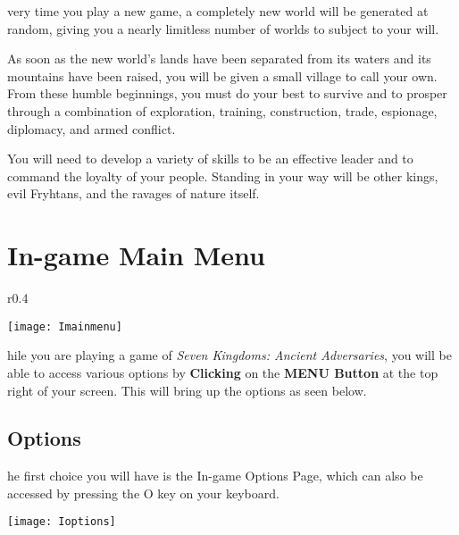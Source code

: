very time you play a new game, a completely new world will be generated at random, giving you a nearly limitless number of worlds to subject to your will.

As soon as the new world’s lands have been separated from its waters and its mountains have been raised, you will be given a small village to call your own. From these humble beginnings, you must do your best to survive and to prosper through a combination of exploration, training, construction, trade, espionage, diplomacy, and armed conflict.

You will need to develop a variety of skills to be an effective leader and to command the loyalty of your people. Standing in your way will be other kings, evil Fryhtans, and the ravages of nature itself.


\section{In-game Main Menu}


\begin{wrapfigure}{r}{0.4\textwidth}
    \begin{center}
        \vspace{-20pt}
        \texttt{[image: Imainmenu]} %
    \end{center}
    \vspace{-40pt}
\end{wrapfigure}


hile you are playing a game of \textit{Seven Kingdoms: Ancient Adversaries}, you will be able to access various options by \textbf{Clicking} on the \textbf{MENU Button} at the top right of your screen. This will bring up the options as seen below.

\subsection{Options}


he first choice you will have is the In-game Options Page, which can also be accessed by pressing the O key on your keyboard.

\begin{center}
    \texttt{[image: Ioptions]} %
\end{center}

